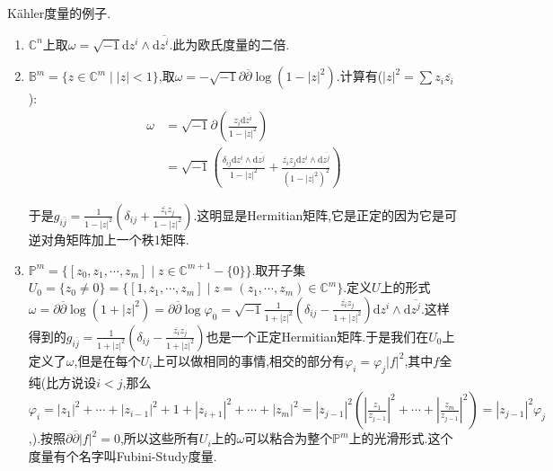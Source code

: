 K\"ahler度量的例子.
\begin{enumerate}
	\item $\mathbb{C}^n$上取$\omega=\sqrt{-1}\mathrm{d}z^i\wedge\mathrm{d}\overline{z^i}$.此为欧氏度量的二倍.
	\item $\mathbb{B}^m=\{z\in\mathbb{C}^m\mid |z|<1\}$,取$\omega=-\sqrt{-1}\partial\overline{\partial}\log(1-|z|^2)$.计算有($|z|^2=\sum z_i\overline{z_i}$):
	\begin{align*}
		\omega&=\sqrt{-1}\partial\left(\frac{z_i\mathrm{d}\overline{z^i}}{1-|z|^2}\right)\\&=\sqrt{-1}\left(\frac{\delta_{ij}\mathrm{d}z^i\wedge\mathrm{d}\overline{z^j}}{1-|z|^2}+\frac{\overline{z_i}z_j\mathrm{d}z^i\wedge\mathrm{d}\overline{z^j}}{(1-|z|^2)^2}\right)
	\end{align*}

    于是$g_{i\overline{j}}=\frac{1}{1-|z|^2}(\delta_{ij}+\frac{\overline{z_i}z_j}{1-|z|^2})$.这明显是Hermitian矩阵,它是正定的因为它是可逆对角矩阵加上一个秩1矩阵.
    \item $\mathbb{P}^m=\{[z_0,z_1,\cdots,z_m]\mid z\in\mathbb{C}^{m+1}-\{0\}\}$.取开子集$U_0=\{z_0\not=0\}=\{[1,z_1,\cdots,z_m]\mid z=(z_1,\cdots,z_m)\in\mathbb{C}^m\}$.定义$U$上的形式$\omega=\partial\overline{\partial}\log(1+|z|^2)=\partial\overline{\partial}\log\varphi_0=\sqrt{-1}\frac{1}{1+|z|^2}\left(\delta_{ij}-\frac{\overline{z_i}z_j}{1+|z|^2}\right)\mathrm{d}z^i\wedge\mathrm{d}\overline{z^j}$.这样得到的$g_{i\overline{j}}=\frac{1}{1+|z|^2}\left(\delta_{ij}-\frac{\overline{z_i}z_j}{1+|z|^2}\right)$也是一个正定Hermitian矩阵.于是我们在$U_0$上定义了$\omega$,但是在每个$U_i$上可以做相同的事情,相交的部分有$\varphi_i=\varphi_j|f|^2$,其中$f$全纯(比方说设$i<j$,那么$\varphi_i=|z_1|^2+\cdots+|z_{i-1}|^2+1+|z_{i+1}|^2+\cdots+|z_m|^2=|z_{j-1}|^2\left(\left|\frac{z_1}{z_{j-1}}\right|^2+\cdots+\left|\frac{z_m}{z_{j-1}}\right|^2\right)=|z_{j-1}|^2\varphi_j$,).按照$\partial\overline{\partial}|f|^2=0$,所以这些所有$U_i$上的$\omega$可以粘合为整个$\mathbb{P}^m$上的光滑形式.这个度量有个名字叫Fubini-Study度量.
\end{enumerate}

